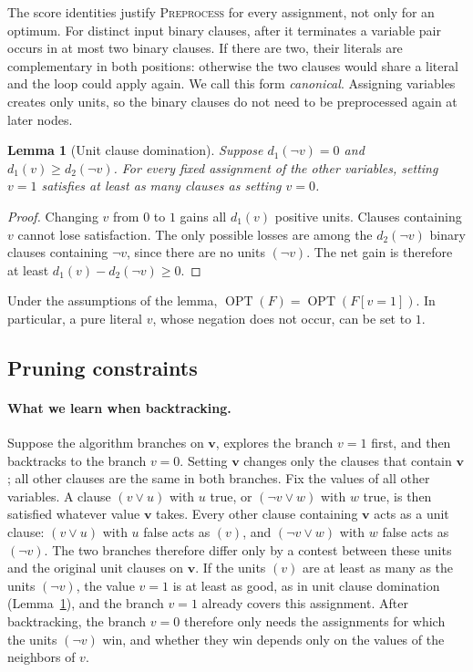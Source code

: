 \documentclass[11pt,a4paper]{article}
\newtheorem{lemma}[theorem]{Lemma}
\theoremstyle{definition}
\theoremstyle{remark}
\newcommand{\OPT}{\operatorname{OPT}}
\begin{document}
The score identities justify \textnormal{\textsc{Preprocess}} for every assignment,
not only for an optimum. For distinct input binary clauses, after it terminates a variable pair occurs in
at most two binary clauses. If there are two, their literals are
complementary in both positions: otherwise the two clauses would share a
literal and the loop could apply again. We call this form \emph{canonical}.
Assigning variables creates only units, so the binary clauses do not need
to be preprocessed again at later nodes.

\begin{lemma}[Unit clause domination]\label{lem:unit_dom}
Suppose $d_1(\neg v)=0$ and $d_1(v)\ge d_2(\neg v)$. For every fixed
assignment of the other variables, setting $v=1$ satisfies at least as many
clauses as setting $v=0$.
\end{lemma}
\begin{proof}
Changing $v$ from $0$ to $1$ gains all $d_1(v)$ positive units. Clauses
containing $v$ cannot lose satisfaction. The only possible losses are among
the $d_2(\neg v)$ binary clauses containing $\neg v$, since there are no
units $(\neg v)$. The net gain is therefore at least
$d_1(v)-d_2(\neg v)\ge0$.
\end{proof}

Under the assumptions of the lemma, $\OPT(F)=\OPT(F[v=1])$. In
particular, a pure literal $v$, whose negation does not occur, can be set
to $1$.

\subsection{Pruning constraints}\label{sec:pruning}

\paragraph{What we learn when backtracking.}
Suppose the algorithm branches on $\mathbf v$, explores the branch $v=1$
first, and then backtracks to the branch $v=0$. Setting $\mathbf v$ changes
only the clauses that contain $\mathbf v$; all other clauses are the same in
both branches. Fix the values of all other variables. A clause $(v\vee u)$
with $u$ true, or $(\neg v\vee w)$ with $w$ true, is then satisfied whatever
value $\mathbf v$ takes. Every other clause containing $\mathbf v$ acts as a
unit clause: $(v\vee u)$ with $u$ false acts as $(v)$, and $(\neg v\vee w)$
with $w$ false acts as $(\neg v)$. The two branches therefore differ only by
a contest between these units and the original unit clauses on
$\mathbf v$. If the units $(v)$ are at least as many as the units
$(\neg v)$, the value $v=1$ is at least as good, as in unit clause
domination (Lemma~\ref{lem:unit_dom}), and the branch $v=1$ already covers
this assignment. After backtracking, the branch $v=0$ therefore only needs
the assignments for which the units $(\neg v)$ win, and whether they win
depends only on the values of the neighbors of $v$.
\end{document}
